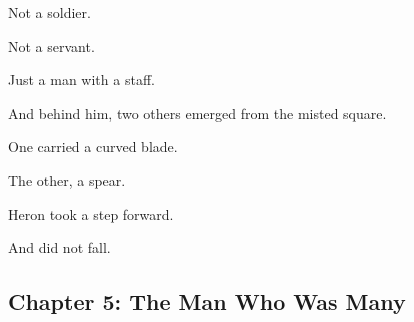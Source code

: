 \documentclass[9pt]{article}
\begin{document}
Not a soldier.

Not a servant.

Just a man with a staff.

And behind him, two others emerged from the misted square.

One carried a curved blade.

The other, a spear.

\vspace{1em}

Heron took a step forward.

And did not fall.

\newpage

\subsection*{Chapter 5: The Man Who Was Many}

\vspace{1in}
\end{document}
